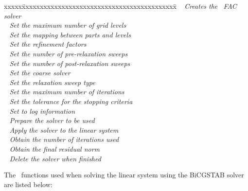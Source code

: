 \documentclass[10pt]{article}
\begin{document}
 \begin{tabbing}
xxxxx\=xxxxxxxxxxxxxxxxxxxxxxxxxxxxxxxxxxxxxxxxxxx\=\kill
\> \done\ 
   \> \textit{Creates the \hypre\ FAC solver} \\
\> \done\ 
   \> \textit{Set the maximum number of grid levels} \\
\> \done\ 
   \> \textit{Set the mapping between parts and levels} \\
\> \done\ 
   \> \textit{Set the refinement factors} \\
\> \done\ 
   \> \textit{Set the number of pre-relaxation sweeps} \\
\> \done\ 
   \> \textit{Set the number of post-relaxation sweeps} \\
\> \done\ 
   \> \textit{Set the coarse solver} \\
\> \done\ 
   \> \textit{Set the relaxation sweep type} \\
\> \done\ 
   \> \textit{Set the maximum number of iterations} \\
\> \done\ 
   \> \textit{Set the tolerance for the stopping criteria} \\
\> \done\ 
   \> \textit{Set to log information} \\
\> \done\ 
   \> \textit{Prepare the solver to be used} \\
\> \done\ 
   \> \textit{Apply the solver to the linear system} \\
\> \done\ 
   \> \textit{Obtain the number of iterations used} \\
\> \done\ 
   \> \textit{Obtain the final residual norm} \\
\> \done\ 
   \> \textit{Delete the solver when finished}
\end{tabbing}

The \hypre\ functions used when solving the linear system using
the BiCGSTAB solver are listed below:
\end{document}

